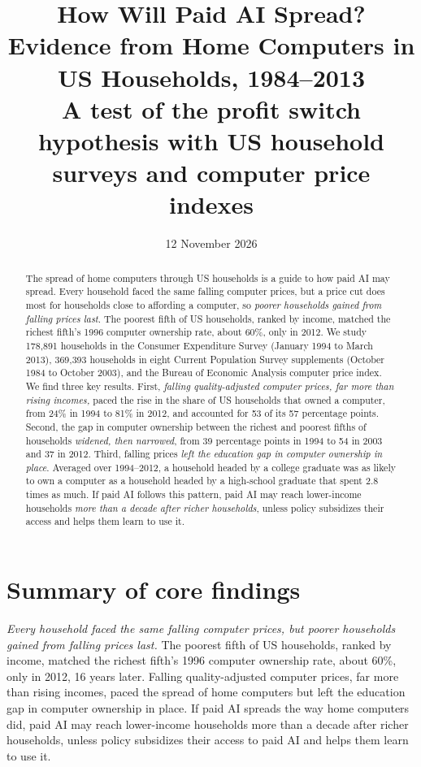 \documentclass[11pt]{article}
\title{How Will Paid AI Spread? Evidence from Home Computers in US Households, 1984--2013\\[0.4em]
\large A test of the profit switch hypothesis with US household surveys and computer price indexes}
\author{}
\date{12 November 2026}
\begin{document}
\maketitle

\begin{abstract}
\noindent The spread of home computers through US households is a guide to how paid AI may spread. Every household faced the same falling computer prices, but a price cut does most for households close to affording a computer, so \emph{poorer households gained from falling prices last}. The poorest fifth of US households, ranked by income, matched the richest fifth's 1996 computer ownership rate, about 60\%, only in 2012. We study 178{,}891 households in the Consumer Expenditure Survey (January 1994 to March 2013), 369{,}393 households in eight Current Population Survey supplements (October 1984 to October 2003), and the Bureau of Economic Analysis computer price index. We find three key results. First, \emph{falling quality-adjusted computer prices, far more than rising incomes,} paced the rise in the share of US households that owned a computer, from 24\% in 1994 to 81\% in 2012, and accounted for 53 of its 57 percentage points. Second, the gap in computer ownership between the richest and poorest fifths of households \emph{widened, then narrowed}, from 39 percentage points in 1994 to 54 in 2003 and 37 in 2012. Third, falling prices \emph{left the education gap in computer ownership in place}. Averaged over 1994--2012, a household headed by a college graduate was as likely to own a computer as a household headed by a high-school graduate that spent 2.8 times as much. If paid AI follows this pattern, paid AI may reach lower-income households \emph{more than a decade after richer households}, unless policy subsidizes their access and helps them learn to use it.
\end{abstract}

\clearpage
\section*{Summary of core findings}

\noindent \emph{Every household faced the same falling computer prices, but poorer households gained from falling prices last.} The poorest fifth of US households, ranked by income, matched the richest fifth's 1996 computer ownership rate, about 60\%, only in 2012, 16 years later. Falling quality-adjusted computer prices, far more than rising incomes, paced the spread of home computers but left the education gap in computer ownership in place. If paid AI spreads the way home computers did, paid AI may reach lower-income households more than a decade after richer households, unless policy subsidizes their access to paid AI and helps them learn to use it.
\end{document}
